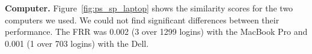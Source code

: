 \noindent\textbf{Computer.}
Figure~\ref{fig:ps_sp_laptop} shows the similarity scores for the two computers we used.
We could not find significant differences between their performance.
The FRR was
0.002 (3 over 1299 logins) with the MacBook Pro and
0.001 (1 over 703 logins) with the Dell. %

\begin{figure}[!ht]
\centering
%
%


\end{figure}
